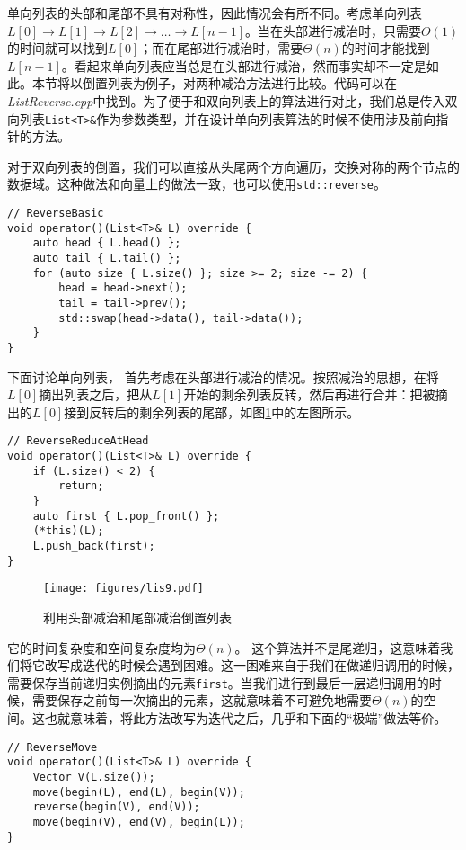 单向列表的头部和尾部不具有对称性，因此情况会有所不同。考虑单向列表$L[0]\to L[1]\to L[2]\to \dots \to L[n-1]$。当在头部进行减治时，只需要$O(1)$的时间就可以找到$L[0]$；而在尾部进行减治时，需要$\Theta(n)$的时间才能找到$L[n-1]$。看起来单向列表应当总是在头部进行减治，然而事实却不一定是如此。本节将以倒置列表为例子，对两种减治方法进行比较。代码可以在\textit{ListReverse.cpp}中找到。为了便于和双向列表上的算法进行对比，我们总是传入双向列表\lstinline{List<T>&}作为参数类型，并在设计单向列表算法的时候不使用涉及前向指针的方法。

对于双向列表的倒置，我们可以直接从头尾两个方向遍历，交换对称的两个节点的数据域。这种做法和向量上的做法一致，也可以使用\lstinline{std::reverse}。
\begin{lstlisting}
// ReverseBasic
void operator()(List<T>& L) override {
    auto head { L.head() };
    auto tail { L.tail() };
    for (auto size { L.size() }; size >= 2; size -= 2) {
        head = head->next();
        tail = tail->prev();
        std::swap(head->data(), tail->data());
    }
}
\end{lstlisting}

下面讨论单向列表，
首先考虑在头部进行减治的情况。按照减治的思想，在将$L[0]$摘出列表之后，把从$L[1]$开始的剩余列表反转，然后再进行合并：把被摘出的$L[0]$接到反转后的剩余列表的尾部，如图\ref{fig:lis9}中的左图所示。



\begin{lstlisting}
// ReverseReduceAtHead
void operator()(List<T>& L) override {
    if (L.size() < 2) {
        return;
    }
    auto first { L.pop_front() };
    (*this)(L);
    L.push_back(first);
}
\end{lstlisting}

\begin{figure}
  \centering
  \texttt{[image: figures/lis9.pdf]}
  \caption{利用头部减治和尾部减治倒置列表}
  \label{fig:lis9}
\end{figure}

它的时间复杂度和空间复杂度均为$\Theta(n)$。
这个算法并不是尾递归，这意味着我们将它改写成迭代的时候会遇到困难。这一困难来自于我们在做递归调用的时候，需要保存当前递归实例摘出的元素\lstinline{first}。当我们进行到最后一层递归调用的时候，需要保存之前每一次摘出的元素，这就意味着不可避免地需要$\Theta(n)$的空间。这也就意味着，将此方法改写为迭代之后，几乎和下面的“极端”做法等价。

\begin{lstlisting}
// ReverseMove
void operator()(List<T>& L) override {
    Vector V(L.size());
    move(begin(L), end(L), begin(V));
    reverse(begin(V), end(V));
    move(begin(V), end(V), begin(L));
}
\end{lstlisting}

